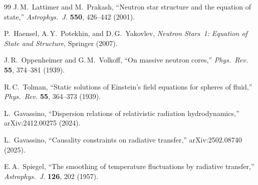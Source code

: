 \begin{thebibliography}{99}
J.\,M.~Lattimer and M.~Prakash,
``Neutron star structure and the equation of state,''
\emph{Astrophys.\ J.} \textbf{550}, 426--442 (2001).

P.~Haensel, A.\,Y.~Potekhin, and D.\,G.~Yakovlev,
\emph{Neutron Stars~1: Equation of State and Structure},
Springer (2007).

J.\,R.~Oppenheimer and G.\,M.~Volkoff,
``On massive neutron cores,''
\emph{Phys.\ Rev.} \textbf{55}, 374--381 (1939).

R.\,C.~Tolman,
``Static solutions of Einstein's field equations for spheres of fluid,''
\emph{Phys.\ Rev.} \textbf{55}, 364--373 (1939).

L.~Gavassino,
``Dispersion relations of relativistic radiation hydrodynamics,''
arXiv:2412.00275 (2024).

L.~Gavassino,
``Causality constraints on radiative transfer,''
arXiv:2502.08740 (2025).

E.\,A.~Spiegel,
``The smoothing of temperature fluctuations by radiative transfer,''
\emph{Astrophys.\ J.} \textbf{126}, 202 (1957).
\end{thebibliography}
